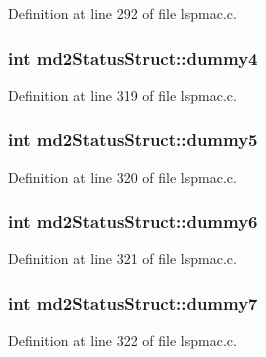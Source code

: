 Definition at line 292 of file lspmac.\-c.

\hypertarget{structmd2StatusStruct_adaa01db9cf77d95756bc3156fb702600}{
\subsubsection[{dummy4}]{\setlength{\rightskip}{0pt plus 5cm}int md2\-Status\-Struct\-::dummy4}}\label{structmd2StatusStruct_adaa01db9cf77d95756bc3156fb702600}


Definition at line 319 of file lspmac.\-c.

\hypertarget{structmd2StatusStruct_af4f8869f8954c6162cae80000c54694f}{
\subsubsection[{dummy5}]{\setlength{\rightskip}{0pt plus 5cm}int md2\-Status\-Struct\-::dummy5}}\label{structmd2StatusStruct_af4f8869f8954c6162cae80000c54694f}


Definition at line 320 of file lspmac.\-c.

\hypertarget{structmd2StatusStruct_a864a2234ede061ec2380230ebf29ce70}{
\subsubsection[{dummy6}]{\setlength{\rightskip}{0pt plus 5cm}int md2\-Status\-Struct\-::dummy6}}\label{structmd2StatusStruct_a864a2234ede061ec2380230ebf29ce70}


Definition at line 321 of file lspmac.\-c.

\hypertarget{structmd2StatusStruct_a91f38d814222edeffa67a6a3ab61f5d6}{
\subsubsection[{dummy7}]{\setlength{\rightskip}{0pt plus 5cm}int md2\-Status\-Struct\-::dummy7}}\label{structmd2StatusStruct_a91f38d814222edeffa67a6a3ab61f5d6}


Definition at line 322 of file lspmac.\-c.

